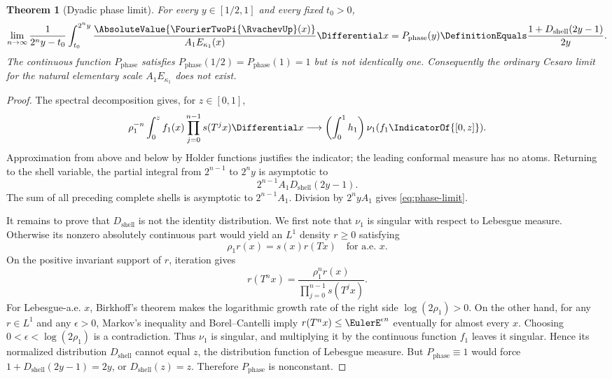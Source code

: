 \documentclass[11pt,oneside]{article}
\numberwithin{equation}{section}
\newtheorem{theorem}{Theorem}[section]
\theoremstyle{definition}
\theoremstyle{remark}
\newcommand{\ShellLimitDistribution}{D_{\mathrm{shell}}}
\newcommand{\ShellPhaseProfile}{P_{\mathrm{phase}}}
\begin{document}
\begin{theorem}[Dyadic phase limit]
\label{thm:phase-limit}
For every $y\in[1/2,1]$ and every fixed $t_0>0$,
\begin{equation}
 \lim_{n\to\infty}
 \frac1{2^ny-t_0}\int_{t_0}^{2^ny}
 \frac{\AbsoluteValue{\FourierTwoPi{\RvachevUp}(x)}}{A_1E_{\kappa_1}(x)}\Differential x
 =\ShellPhaseProfile(y)\DefinitionEquals\frac{1+\ShellLimitDistribution(2y-1)}{2y}.
 \label{eq:phase-limit}
\end{equation}
The continuous function $\ShellPhaseProfile$ satisfies
$\ShellPhaseProfile(1/2)=\ShellPhaseProfile(1)=1$ but is not identically one.  Consequently the ordinary
Cesaro limit for the natural elementary scale $A_1E_{\kappa_1}$ does not exist.
\end{theorem}

\begin{proof}
The spectral decomposition gives, for $z\in[0,1]$,
\[
 \rho_1^{-n}\int_0^z f_1(x)
 \prod_{j=0}^{n-1}s(T^jx)\Differential x
 \longrightarrow
 \left(\int_0^1h_1\right)\nu_1(f_1\IndicatorOf{[0,z]}).
\]
Approximation from above and below by Holder functions justifies the indicator; the
leading conformal measure has no atoms.  Returning to the shell variable, the partial
integral from $2^{n-1}$ to $2^ny$ is asymptotic to
\[
 2^{n-1}A_1\ShellLimitDistribution(2y-1).
\]
The sum of all preceding complete shells is asymptotic to $2^{n-1}A_1$.  Division by
$2^nyA_1$ gives \eqref{eq:phase-limit}.

It remains to prove that $\ShellLimitDistribution$ is not the identity distribution.  We first note that
$\nu_1$ is singular with respect to Lebesgue measure.  Otherwise its nonzero absolutely
continuous part would yield an $L^1$ density $r\ge0$ satisfying
\begin{equation}
 \rho_1r(x)=s(x)r(Tx)
 \quad\text{for a.e. }x.
 \label{eq:conformal-density}
\end{equation}
On the positive invariant support of $r$, iteration gives
\[
 r(T^nx)=\frac{\rho_1^nr(x)}{\prod_{j=0}^{n-1}s(T^jx)}.
\]
For Lebesgue-a.e. $x$, Birkhoff's theorem makes the logarithmic growth rate of the right
side $\log(2\rho_1)>0$.  On the other hand, for any $r\in L^1$ and any $\epsilon>0$,
Markov's inequality and Borel--Cantelli imply
$r(T^nx)\le\EulerE^{\epsilon n}$ eventually for almost every $x$.  Choosing
$0<\epsilon<\log(2\rho_1)$ is a contradiction.  Thus $\nu_1$ is singular, and multiplying
it by the continuous function $f_1$ leaves it singular.  Hence its normalized distribution
$\ShellLimitDistribution$ cannot equal $z$, the distribution function of Lebesgue measure.  But
$\ShellPhaseProfile\equiv1$ would force
$1+\ShellLimitDistribution(2y-1)=2y$, or $\ShellLimitDistribution(z)=z$.  Therefore $\ShellPhaseProfile$ is nonconstant.
\end{proof}
\end{document}
